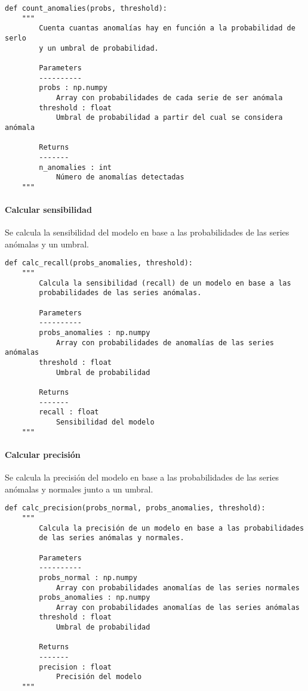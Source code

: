 \begin{lstlisting}
def count_anomalies(probs, threshold):
    """
        Cuenta cuantas anomalías hay en función a la probabilidad de serlo
        y un umbral de probabilidad.

        Parameters
        ----------
        probs : np.numpy
            Array con probabilidades de cada serie de ser anómala
        threshold : float
            Umbral de probabilidad a partir del cual se considera anómala

        Returns
        -------
        n_anomalies : int
            Número de anomalías detectadas
    """
\end{lstlisting}

\paragraph{Calcular sensibilidad}

Se calcula la sensibilidad del modelo en base a las probabilidades de las series anómalas y un umbral.

\begin{lstlisting}
def calc_recall(probs_anomalies, threshold):
    """
        Calcula la sensibilidad (recall) de un modelo en base a las
        probabilidades de las series anómalas.

        Parameters
        ----------
        probs_anomalies : np.numpy
            Array con probabilidades de anomalías de las series anómalas
        threshold : float
            Umbral de probabilidad

        Returns
        -------
        recall : float
            Sensibilidad del modelo
    """
\end{lstlisting}

\paragraph{Calcular precisión}

Se calcula la precisión del modelo en base a las probabilidades de las series anómalas y normales junto a un umbral.

\begin{lstlisting}
def calc_precision(probs_normal, probs_anomalies, threshold):
    """
        Calcula la precisión de un modelo en base a las probabilidades
        de las series anómalas y normales.

        Parameters
        ----------
        probs_normal : np.numpy
            Array con probabilidades anomalías de las series normales
        probs_anomalies : np.numpy
            Array con probabilidades anomalías de las series anómalas
        threshold : float
            Umbral de probabilidad

        Returns
        -------
        precision : float
            Precisión del modelo
    """
\end{lstlisting}

